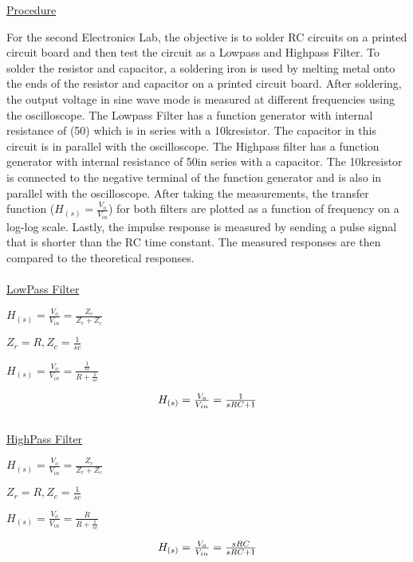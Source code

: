 \underline{Procedure}

For the second Electronics Lab, the objective is to solder RC circuits on a printed circuit board and then test the circuit as a Lowpass and Highpass Filter. To solder the resistor and capacitor, a soldering iron is used by melting metal onto the ends of the resistor and capacitor on a printed circuit board. After soldering, the output voltage in sine wave mode is measured at different frequencies using the oscilloscope. The Lowpass Filter has a function generator with internal resistance of (50\textOmega) which is in series with a 10k\textOmega resistor. The capacitor in this circuit is in parallel with the oscilloscope. The Highpass filter has a function generator with internal resistance of 50\textOmega  in series with a capacitor. The 10k\textOmega resistor is connected to the negative terminal of the function generator and is also in parallel with the oscilloscope. After taking the measurements, the transfer function ($H_{(s)} = \frac{V_o}{V_{in}}$) for both filters are plotted as a function of frequency on a log-log scale. Lastly, the impulse response is measured by sending a pulse signal that is shorter than the RC time constant. The measured responses are then compared to the theoretical responses. \\
\\
\underline{LowPass Filter}
\\
\centerline{ $ H_{(s)} = \frac{V_o}{V_{in}} = \frac{Z_c}{Z_r + Z_c} $ }
\centerline{ $ Z_r = R, Z_c = \frac{1}{sc} $}
\centerline{ $ H_{(s)} = \frac{V_o}{V_{in}} = \frac{\frac{1}{sc}}{R + \frac{1}{sc}} $ }
\begin{equation}
\label{eq:LowPassFunction}
\centerline{ $ H_{(s)} = \frac{V_o}{V_{in}} = \frac{1}{sRC + 1} $ }
\end{equation}
\\
\underline{HighPass Filter}
\\
\centerline{ $ H_{(s)} = \frac{V_o}{V_{in}} = \frac{Z_r}{Z_r + Z_c} $ }
\centerline{ $ Z_r = R, Z_c = \frac{1}{sc} $}
\centerline{ $ H_{(s)} = \frac{V_o}{V_{in}} = \frac{R}{R + \frac{1}{sc}} $ }
\begin{equation}
\label{eq:HighPassFunction}
\centerline{ $ H_{(s)} = \frac{V_o}{V_{in}} = \frac{sRC}{sRC + 1} $ }
\end{equation}





